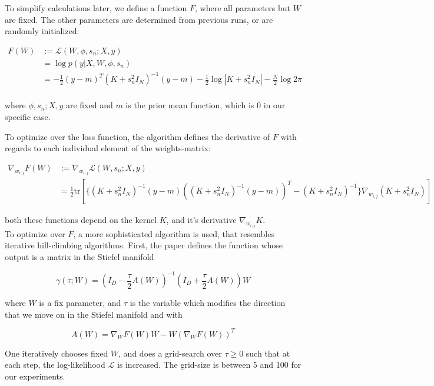 To simplify calculations later, we define a function $F$, where all parameters but $W$ are fixed. 
The other parameters are determined from previous runs, or are randomly initialized:

\begin{align}
F(W) &:= \mathcal{L}(W, \phi, s_n; X, y) \\
& = \log p(y | X, W, \phi, s_n) \\
& =  -\frac{1}{2} (y - m)^T (K + s_n^2 I_N)^{-1} (y - m) -\frac{1}{2} \log|K + s_n^2 I_N| -\frac{N}{2} \log 2 \pi   \\
\end{align}

where $\phi, s_n; X, y$ are fixed and $m$ is the prior mean function, which is 0 in our specific case.

To optimize over the loss function, the algorithm defines the derivative of $F$ with regards to each individual element of the weights-matrix:

\begin{align}
\nabla_{w_{i,j}} F(W) &:= \nabla_{w_{i,j}} \mathcal{L}(W, s_n; X, y) \\
& = \frac{1}{2} \text{tr} \left[ \{ (K + s_n^2 I_N)^{-1} (y-m) \left( (K + s_n^2 I_N)^{-1} (y-m) \right)^T - (K + s_n^2 I_N)^{-1} \} \nabla_{w_{i,j}} (K + s_n^2 I_N) \right]
\end{align}

both these functions depend on the kernel $K$, and it's derivative $\nabla_{w_{i,j}} K$. \\

To optimize over $F$, a more sophisticated algorithm is used, that resembles iterative hill-climbing algorithms.
First, the paper defines the function whose output is a matrix in the Stiefel manifold

\begin{equation}
\gamma(\tau; W) = (I_D - \frac{\tau}{2} A(W) )^{-1} (I_D + \frac{\tau}{2} A(W) ) W
\end{equation}


where $W$ is a fix parameter, and $\tau$ is the variable which modifies the direction that we move on in the Stiefel manifold and with

\begin{equation}
A(W) = \nabla_{W} F(W) W - W ( \nabla_{W} F(W) )^T
\end{equation}

One iteratively chooses fixed $W$, and does a grid-search over $\tau \geq 0$ such that at each step, the log-likelihood $\mathcal{L}$ is increased.
The grid-size is between 5 and 100 for our experiments.

